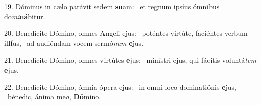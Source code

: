 19. Dóminus in cælo parávit sedem \textbf{su}am: \ast\  et regnum ipsíus ómnibus do\textit{mi}\textbf{ná}bitur.\

20. Benedícite Dómino, omnes Angeli ejus: \dag\  poténtes virtúte, faciéntes verbum il\textbf{lí}us, \ast\  ad audiéndam vocem sermó\textit{num} \textbf{e}jus.\

21. Benedícite Dómino, omnes virtútes \textbf{e}jus: \ast\  minístri ejus, qui fácitis voluntá\textit{tem} \textbf{e}jus.\

22. Benedícite Dómino, ómnia ópera ejus: \dag\  in omni loco dominatiónis \textbf{e}jus, \ast\  bénedic, ánima me\textit{a}, \textbf{Dó}mino.\

